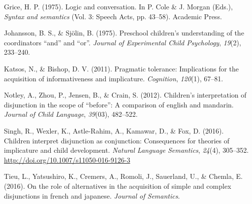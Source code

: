 \documentclass[10pt, letterpaper]{article}
\begin{document}
\hypertarget{ref-grice1975logicconvo}{}
Grice, H. P. (1975). Logic and conversation. In P. Cole \& J. Morgan
(Eds.), \emph{Syntax and semantics} (Vol. 3: Speech Acts, pp. 43--58).
Academic Press.

\hypertarget{ref-johansson1975preschool}{}
Johansson, B. S., \& Sjölin, B. (1975). Preschool children's
understanding of the coordinators ``and'' and ``or''. \emph{Journal of
Experimental Child Psychology}, \emph{19}(2), 233--240.

\hypertarget{ref-katsos2011pragmatic}{}
Katsos, N., \& Bishop, D. V. (2011). Pragmatic tolerance: Implications
for the acquisition of informativeness and implicature.
\emph{Cognition}, \emph{120}(1), 67--81.

\hypertarget{ref-notley2012children}{}
Notley, A., Zhou, P., Jensen, B., \& Crain, S. (2012). Children's
interpretation of disjunction in the scope of ``before'': A comparison
of english and mandarin. \emph{Journal of Child Language},
\emph{39}(03), 482--522.

\hypertarget{ref-Singh2016}{}
Singh, R., Wexler, K., Astle-Rahim, A., Kamawar, D., \& Fox, D. (2016).
Children interpret disjunction as conjunction: Consequences for theories
of implicature and child development. \emph{Natural Language Semantics},
\emph{24}(4), 305--352. \url{http://doi.org/10.1007/s11050-016-9126-3}

\hypertarget{ref-tieu2016}{}
Tieu, L., Yatsushiro, K., Cremers, A., Romoli, J., Sauerland, U., \&
Chemla, E. (2016). On the role of alternatives in the acquisition of
simple and complex disjunctions in french and japanese. \emph{Journal of
Semantics}.
\end{document}
